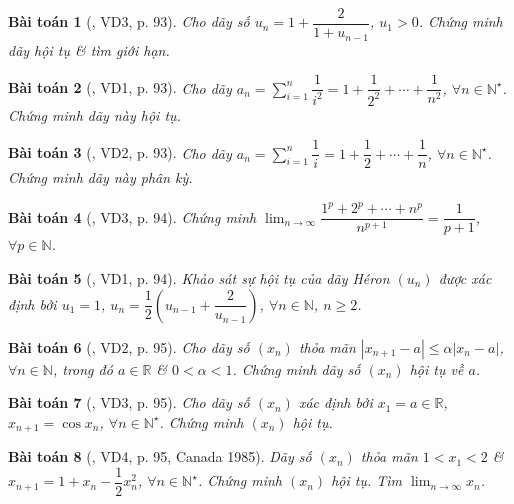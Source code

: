 \documentclass[oneside]{book}
\newtheorem{baitoan}{Bài toán}
\begin{document}
\begin{baitoan}[\cite{Hung_nang_cao_phat_trien_Toan_11_tap_1}, VD3, p. 93]
	Cho dãy số $u_n = 1 + \dfrac{2}{1 + u_{n-1}}$, $u_1 > 0$. Chứng minh dãy hội tụ \& tìm giới hạn.
\end{baitoan}

\begin{baitoan}[\cite{Hung_nang_cao_phat_trien_Toan_11_tap_1}, VD1, p. 93]
	Cho dãy $a_n = \sum_{i=1}^n \dfrac{1}{i^2} = 1 + \dfrac{1}{2^2} + \cdots + \dfrac{1}{n^2}$, $\forall n\in\mathbb{N}^\star$. Chứng minh dãy này hội tụ.
\end{baitoan}

\begin{baitoan}[\cite{Hung_nang_cao_phat_trien_Toan_11_tap_1}, VD2, p. 93]
	Cho dãy $a_n = \sum_{i=1}^n \dfrac{1}{i} = 1 + \dfrac{1}{2} + \cdots + \dfrac{1}{n}$, $\forall n\in\mathbb{N}^\star$. Chứng minh dãy này phân kỳ.
\end{baitoan}

\begin{baitoan}[\cite{Hung_nang_cao_phat_trien_Toan_11_tap_1}, VD3, p. 94]
	Chứng minh $\lim_{n\to\infty} \dfrac{1^p + 2^p + \cdots + n^p}{n^{p + 1}} = \dfrac{1}{p + 1}$, $\forall p\in\mathbb{N}$.
\end{baitoan}

\begin{baitoan}[\cite{Hung_nang_cao_phat_trien_Toan_11_tap_1}, VD1, p. 94]
	Khảo sát sự hội tụ của {\rm dãy H\'eron} $(u_n)$ được xác định bởi $u_1 = 1$, $u_n = \dfrac{1}{2}\left(u_{n-1} + \dfrac{2}{u_{n-1}}\right)$, $\forall n\in\mathbb{N}$, $n\ge2$.
\end{baitoan}

\begin{baitoan}[\cite{Hung_nang_cao_phat_trien_Toan_11_tap_1}, VD2, p. 95]
	Cho dãy số $(x_n)$ thỏa mãn $|x_{n+1} - a|\le\alpha|x_n - a|$, $\forall n\in\mathbb{N}$, trong đó $a\in\mathbb{R}$ \& $0 < \alpha < 1$. Chứng minh dãy số $(x_n)$ hội tụ về $a$.
\end{baitoan}

\begin{baitoan}[\cite{Hung_nang_cao_phat_trien_Toan_11_tap_1}, VD3, p. 95]
	Cho dãy số $(x_n)$ xác định bởi $x_1 = a\in\mathbb{R}$, $x_{n+1} = \cos x_n$, $\forall n\in\mathbb{N}^\star$. Chứng minh $(x_n)$ hội tụ.
\end{baitoan}

\begin{baitoan}[\cite{Hung_nang_cao_phat_trien_Toan_11_tap_1}, VD4, p. 95, Canada 1985]
	Dãy số $(x_n)$ thỏa mãn $1 < x_1 < 2$ \& $x_{n+1} = 1 + x_n - \dfrac{1}{2}x_n^2$, $\forall n\in\mathbb{N}^\star$. Chứng minh $(x_n)$ hội tụ. Tìm $\lim_{n\to\infty} x_n$.
\end{baitoan}
\end{document}
